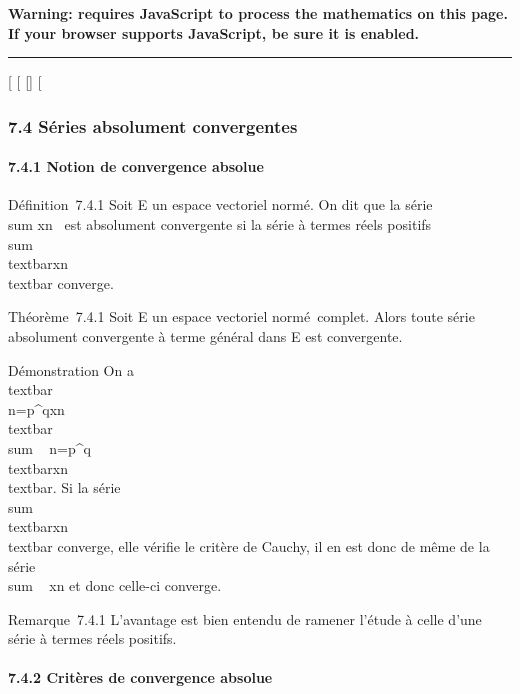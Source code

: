 \textbf{Warning: 
requires JavaScript to process the mathematics on this page.\\ If your
browser supports JavaScript, be sure it is enabled.}

\begin{center}\rule{3in}{0.4pt}\end{center}

{[}
{[}
{[}{]}
{[}

\subsubsection{7.4 Séries absolument convergentes}

\paragraph{7.4.1 Notion de convergence absolue}

Définition~7.4.1 Soit E un espace vectoriel normé. On dit que la série
\\sum  xn~ est
absolument convergente si la série à termes réels positifs
\\sum ~
\\textbar{}xn\\textbar{}
converge.

Théorème~7.4.1 Soit E un espace vectoriel normé~complet. Alors toute
série absolument convergente à terme général dans E est convergente.

Démonstration On a
\\textbar{}\\\sum
 n=p^qxn\\textbar{}
\leq\\sum ~
n=p^q\\textbar{}xn\\textbar{}.
Si la série \\sum ~
\\textbar{}xn\\textbar{}
converge, elle vérifie le critère de Cauchy, il en est donc de même de
la série \\sum ~
xn et donc celle-ci converge.

Remarque~7.4.1 L'avantage est bien entendu de ramener l'étude à celle
d'une série à termes réels positifs.

\paragraph{7.4.2 Critères de convergence absolue}

